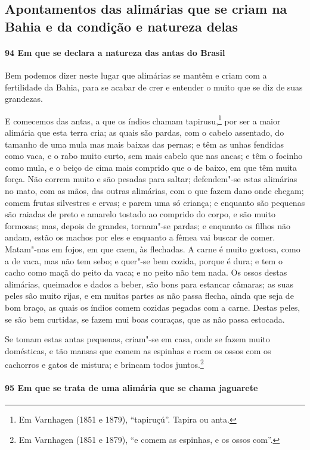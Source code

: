 \subsection{Apontamentos das alimárias que se criam na Bahia e da condição e natureza
delas}

\paragraph{94 Em que se declara a natureza das antas do Brasil}

Bem podemos dizer neste lugar que alimárias se mantêm e criam com a fertilidade da Bahia,
para se acabar de crer e entender o muito que se diz de suas grandezas.

E comecemos das antas, a que os índios chamam tapirusu,\footnote{ Em Varnhagen (1851 e
1879), ``tapiruçú''. Tapira ou anta.} por ser a maior alimária que esta terra cria; as
quais são pardas, com o cabelo assentado, do tamanho de uma mula mas mais baixas das
pernas; e têm as unhas fendidas como vaca, e o rabo muito curto, sem mais cabelo que nas
ancas; e têm o focinho como mula, e o beiço de cima mais comprido que o de baixo, em que
têm muita força. Não correm muito e são pesadas para saltar; defendem"-se estas alimárias
no mato, com as mãos, das outras alimárias, com o que fazem dano onde chegam; comem frutas
silvestres e ervas; e parem uma só criança; e enquanto são pequenas são raiadas de preto e
amarelo tostado ao comprido do corpo, e são muito formosas; mas, depois de grandes,
tornam"-se pardas; e enquanto os filhos não andam, estão os machos por eles e enquanto a
fêmea vai buscar de comer. Matam"-nas em fojos, em que caem, às flechadas. A carne é muito
gostosa, como a de vaca, mas não tem sebo; e quer"-se bem cozida, porque é dura; e tem o
cacho como maçã do peito da vaca; e no peito não tem nada. Os ossos destas alimárias,
queimados e dados a beber, são bons para estancar câmaras; as suas peles são muito rijas,
e em muitas partes as não passa flecha, ainda que seja de bom braço, as quais os índios
comem cozidas pegadas com a carne. Destas peles, se são bem curtidas, se fazem mui boas
couraças, que as não passa estocada.

Se tomam estas antas pequenas, criam"-se em casa, onde se fazem muito domésticas, e tão
mansas que comem as espinhas e roem os ossos com os cachorros e gatos de mistura; e
brincam todos juntos.\footnote{ Em Varnhagen (1851 e 1879), ``e comem as espinhas, e os
ossos com''.}

\paragraph{95 Em que se trata de uma alimária que se chama jaguarete}

